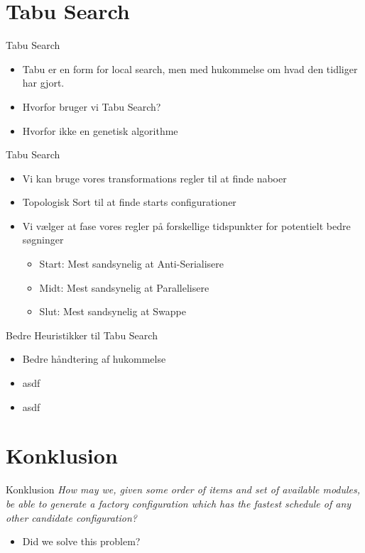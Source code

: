 \section{Tabu Search}
\begin{frame} {Tabu Search}
	\begin{itemize}
		\item Tabu er en form for local search, men med hukommelse om hvad den tidliger har gjort.
		\item Hvorfor bruger vi Tabu Search?
		\item Hvorfor ikke en genetisk algorithme
	\end{itemize}
\end{frame}

\begin{frame} {Tabu Search}
	\begin{itemize}
		\item Vi kan bruge vores transformations regler til at finde naboer
		\item Topologisk Sort til at finde starts configurationer
		\item Vi vælger at fase vores regler på forskellige tidspunkter for potentielt bedre søgninger
		\begin{itemize}
			\item Start: Mest sandsynelig at Anti-Serialisere
			\item Midt: Mest sandsynelig at Parallelisere
			\item Slut: Mest sandsynelig at Swappe
		\end{itemize}
	\end{itemize}
\end{frame}

\begin{frame}{Bedre Heuristikker til Tabu Search}
	\begin{itemize}
		\item Bedre håndtering af hukommelse
		\item asdf
		\item asdf
	\end{itemize}
\end{frame}


\section{Konklusion}
\begin{frame}{Konklusion}
	\textit{How may we, given some order of items and set of available modules, be able to generate a factory configuration which has the fastest schedule of any other candidate configuration?}
	\begin{itemize}
		\item Did we solve this problem?
	\end{itemize}
\end{frame}

